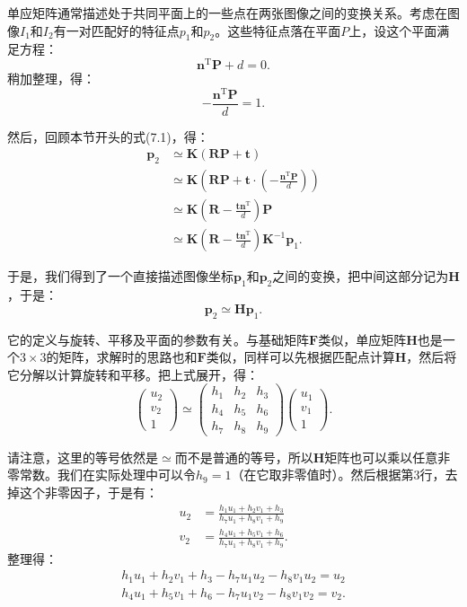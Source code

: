 单应矩阵通常描述处于共同平面上的一些点在两张图像之间的变换关系。考虑在图像$I_{1}$和$I_{2}$有一对匹配好的特征点$p_{1}$和$p_{2}$。这些特征点落在平面$P$上，设这个平面满足方程：
\begin{equation}
\bm{n}^\mathrm{T} \bm{P} + d = 0.
\end{equation}
稍加整理，得：
\begin{equation}
- \frac{\bm{n}^\mathrm{T} \bm{P} }{d} = 1.
\end{equation}

然后，回顾本节开头的式(7.1)，得：
\begin{align*}
\bm{p}_2 &\simeq \bm{K} ( \bm{R} \bm{P} + \bm{t} ) \\ 
&\simeq \bm{K} \left( \bm{R} \bm{P} + \bm{t} \cdot (- \frac{\bm{n}^\mathrm{T} \bm{P} }{d}) \right) \\
&\simeq \bm{K} \left( \bm{R} - \frac{\bm{t} \bm{n}^\mathrm{T} }{d} \right) \bm{P} \\ 
&\simeq \bm{K} \left( \bm{R} - \frac{\bm{t} \bm{n}^\mathrm{T} }{d} \right) \bm{K}^{-1} \bm{p}_1.
\end{align*}

于是，我们得到了一个直接描述图像坐标$\bm{p}_1$和$\bm{p}_2$之间的变换，把中间这部分记为$\bm{H}$，于是：
\begin{equation}
\bm{p}_2 \simeq \bm{H} \bm{p}_1.
\end{equation}

它的定义与旋转、平移及平面的参数有关。与基础矩阵$\bm{F}$类似，单应矩阵$\bm{H}$也是一个$3 \times 3$的矩阵，求解时的思路也和$\bm{F}$类似，同样可以先根据匹配点计算$\bm{H}$，然后将它分解以计算旋转和平移。把上式展开，得：
\begin{equation}
\begin{pmatrix} 
u_{2}\\v_{2}\\1
\end{pmatrix}
\simeq
\begin{pmatrix}
 h_{1} & h_{2} & h_{3}\\ 
 h_{4} & h_{5} & h_{6}\\ 
 h_{7} & h_{8} & h_{9} 
\end{pmatrix}
\begin{pmatrix} 
u_{1}\\v_{1}\\1
\end{pmatrix}.
\end{equation}

请注意，这里的等号依然是$\simeq$而不是普通的等号，所以$\bm{H}$矩阵也可以乘以任意非零常数。我们在实际处理中可以令$h_9 = 1$（在它取非零值时）。然后根据第3行，去掉这个非零因子，于是有：
\[
\begin{aligned}
u_{2}&=\frac{h_{1}u_{1}+h_{2}v_{1}+h_{3}}{h_{7}u_{1}+h_{8}v_{1}+h_{9}}\\
v_{2}&=\frac{h_{4}u_{1}+h_{5}v_{1}+h_{6}}{h_{7}u_{1}+h_{8}v_{1}+h_{9}}.
\end{aligned}
\]
整理得：
\[
\begin{gathered}
h_{1}u_{1}+h_{2}v_{1}+h_{3}-h_{7}u_{1}u_{2}-h_{8}v_{1}u_{2}=u_{2}\\
h_{4}u_{1}+h_{5}v_{1}+h_{6}-h_{7}u_{1}v_{2}-h_{8}v_{1}v_{2}=v_{2}.
\end{gathered}
\]

